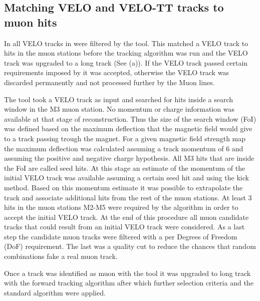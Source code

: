 \subsection{Matching VELO and VELO-TT tracks to muon hits}
\label{sec:muon_matching}

In \runone all VELO tracks in \hltone were filtered by the \mvm tool. This matched a VELO track to hits in the muon
stations before the \FwD tracking algorithm was run and the VELO track was upgraded to a long track (See (a)).
If the VELO track passed certain requirements imposed by \mvm it was accepted, otherwise the VELO track was discarded
permanently and not processed further by the \hltone Muon lines.

The \mvm tool took a VELO track as input and searched for hits inside a search window in the M3 muon station.
No momentum or charge information was available at that stage of reconstruction. Thus the size of the search window (FoI)
was defined based on the maximum deflection that the magnetic field would give to a track passing trough the
\lhcb magnet. For a given magnetic field strength map the maximum deflection was calculated assuming
a track momentum of 6 \gevc and assuming the positive and negative charge hypothesis.
All M3 hits that are inside the FoI are called seed hits.
At this stage an estimate of the momentum of the initial VELO track was available assuming a certain seed hit
and using the kick method\cite{CERN-THESIS-2015-102}. Based on this momentum estimate it was possible
to extrapolate the track and associate additional hits from the rest of the muon stations.
At least 3 hits in the muon stations M2-M5 were required by the algorithm in order to accept the initial VELO track.
At the end of this procedure all muon candidate tracks that could result from an initial VELO track were considered.
As a last step the candidate muon tracks were filtered with a \chisq per Degrees of Freedom (DoF) requirement.
The last was a quality cut to reduce the chances that random combinations fake a real muon track.

Once a track was identified as muon with the \mvm tool it was upgraded to long track with
the forward tracking algorithm after which further selection criteria and the standard  algorithm were applied.



